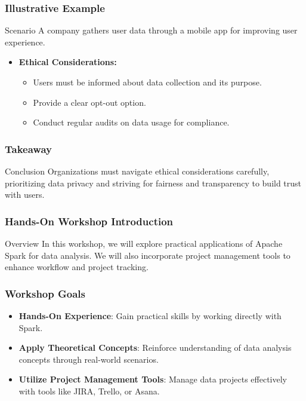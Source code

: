 \documentclass[aspectratio=169]{beamer}
\begin{document}
\begin{frame}[fragile]
    \frametitle{Illustrative Example}
    \begin{block}{Scenario}
        A company gathers user data through a mobile app for improving user experience.
    \end{block}
    \begin{itemize}
        \item \textbf{Ethical Considerations:}
        \begin{itemize}
            \item Users must be informed about data collection and its purpose.
            \item Provide a clear opt-out option.
            \item Conduct regular audits on data usage for compliance.
        \end{itemize}
    \end{itemize}
\end{frame}

\begin{frame}[fragile]
    \frametitle{Takeaway}
    \begin{block}{Conclusion}
        Organizations must navigate ethical considerations carefully, prioritizing data privacy and striving for fairness and transparency to build trust with users.
    \end{block}
\end{frame}

\begin{frame}[fragile]
    \frametitle{Hands-On Workshop Introduction}
    \begin{block}{Overview}
        In this workshop, we will explore practical applications of Apache Spark for data analysis. 
        We will also incorporate project management tools to enhance workflow and project tracking.
    \end{block}
\end{frame}

\begin{frame}[fragile]
    \frametitle{Workshop Goals}
    \begin{itemize}
        \item \textbf{Hands-On Experience}: Gain practical skills by working directly with Spark.
        \item \textbf{Apply Theoretical Concepts}: Reinforce understanding of data analysis concepts through real-world scenarios.
        \item \textbf{Utilize Project Management Tools}: Manage data projects effectively with tools like JIRA, Trello, or Asana.
    \end{itemize}
\end{frame}
\end{document}
